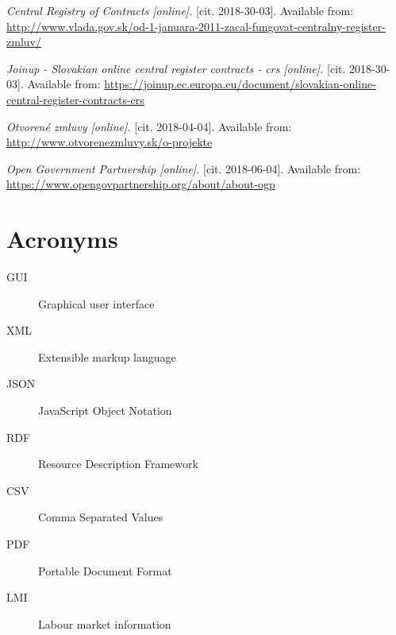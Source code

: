 \documentclass[thesis=B,english]{FITthesis}[2012/06/26]
\begin{document}
\begin{thebibliography}{9}
\textit{Central Registry of Contracts [online].}
[cit. 2018-30-03]. Available from: \url{http://www.vlada.gov.sk/od-1-januara-2011-zacal-fungovat-centralny-register-zmluv/}

\textit{Joinup - Slovakian online central register contracts - crs [online].}
[cit. 2018-30-03]. Available from: \url{https://joinup.ec.europa.eu/document/slovakian-online-central-register-contracts-crs}

\textit{Otvorené zmluvy [online].}
[cit. 2018-04-04]. Available from: \url{http://www.otvorenezmluvy.sk/o-projekte}

\textit{Open Government Partnership [online].}
[cit. 2018-06-04]. Available from: \url{https://www.opengovpartnership.org/about/about-ogp}

\end{thebibliography}

\cite{EUopendataportal}

\chapter{Acronyms}
\begin{description}
	\item[GUI] Graphical user interface
	\item[XML] Extensible markup language
	\item[JSON] JavaScript Object Notation
	\item[RDF] Resource Description Framework
	\item[CSV] Comma Separated Values
	\item[PDF] Portable Document Format
	\item[LMI] Labour market information
\end{description}
\end{document}

